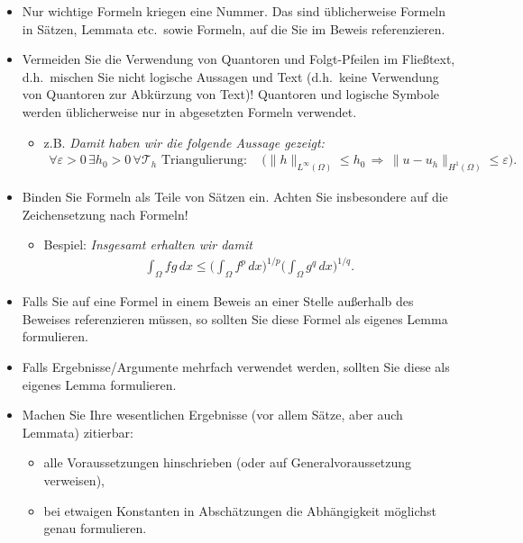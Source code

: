 \documentclass[a4paper,11pt,bibliography=totoc,listof=totoc,headinclude=true,cleardoublepage=empty,oneside]{scrbook}
\begin{document}
{\begin{itemize}
\item Nur wichtige Formeln kriegen eine Nummer. Das sind üblicherweise Formeln in Sät\-zen, Lemmata etc.\ sowie Formeln, auf die Sie im Beweis referenzieren.

\item Vermeiden Sie die Verwendung von Quantoren und Folgt-Pfeilen im Fließtext, d.h.\ mischen Sie nicht logische Aussagen und Text (d.h.\ keine Verwendung von Quantoren zur Abkürzung von Text)! Quantoren und logische Symbole werden üblicherweise nur in abgesetzten Formeln verwendet. 
\begin{itemize}
\item z.B. \emph{Damit haben wir die folgende Aussage gezeigt:
\begin{align*}
 \forall \varepsilon > 0 \, \exists h_0 > 0 \, \forall \mathcal{T}_h\text{ Triangulierung}:
 \quad \Big( \| h \|_{L^\infty(\Omega)} \le h_0
 \, \Longrightarrow \,
 \| u - u_h \|_{H^1(\Omega)} \le \varepsilon \Big).
\end{align*}}
\end{itemize}

\item Binden Sie Formeln als Teile von Sätzen ein. Achten Sie insbesondere auf die Zeichensetzung nach Formeln!
\begin{itemize}
\item Bespiel: \emph{Insgesamt erhalten wir damit
\begin{align*}
 \int_\Omega fg\,dx 
 \le \bigg(\int_\Omega f^p \, dx\bigg)^{1/p} \bigg(\int_\Omega g^q \, dx\bigg)^{1/q}.
\end{align*}}
\end{itemize}

\item Falls Sie auf eine Formel in einem Beweis an einer Stelle außerhalb des Beweises referenzieren müssen, so sollten Sie diese Formel als eigenes Lemma formulieren.

\item Falls Ergebnisse/Argumente mehrfach verwendet werden, sollten Sie diese als eigenes Lemma formulieren.

\item Machen Sie Ihre wesentlichen Ergebnisse (vor allem Sätze, aber auch Lemmata) zitierbar:
\begin{itemize}
\item alle Voraussetzungen hinschrieben (oder auf Generalvoraussetzung verweisen),
\item bei etwaigen Konstanten in Abschätzungen die Abhängigkeit möglichst genau formulieren.
\end{itemize}

\end{itemize}
}
\end{document}
